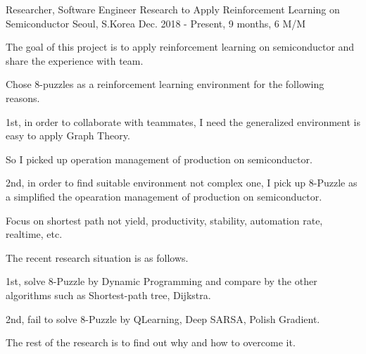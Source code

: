 \begin{cventries}
  \cventry
    {Researcher, Software Engineer} %
    {Research to Apply Reinforcement Learning on Semiconductor} %
    {Seoul, S.Korea} %
    {Dec. 2018 - Present, 9 months, 6 M/M} %
    {
      \begin{cvitems} %
        \item {The goal of this project is to apply reinforcement learning on semiconductor and share the experience with team.}
        \item {Chose 8-puzzles as a reinforcement learning environment for the following reasons.}
        \item {1st, in order to collaborate with teammates, I need the generalized environment is easy to apply Graph Theory.}
        \item {So I picked up operation management of production on semiconductor.}
        \item {2nd, in order to find suitable environment not complex one, I pick up 8-Puzzle as a simplified the opearation management of production on semiconductor.}
        \item {Focus on shortest path not yield, productivity, stability, automation rate, realtime, etc.}
        \item {The recent research situation is as follows.}
        \item {1st, solve 8-Puzzle by Dynamic Programming and compare by the other algorithms such as Shortest-path tree, Dijkstra.}
        \item {2nd, fail to solve 8-Puzzle by QLearning, Deep SARSA, Polish Gradient.}
        \item {The rest of the research is to find out why and how to overcome it.}
      \end{cvitems}
    }


\end{cventries}
